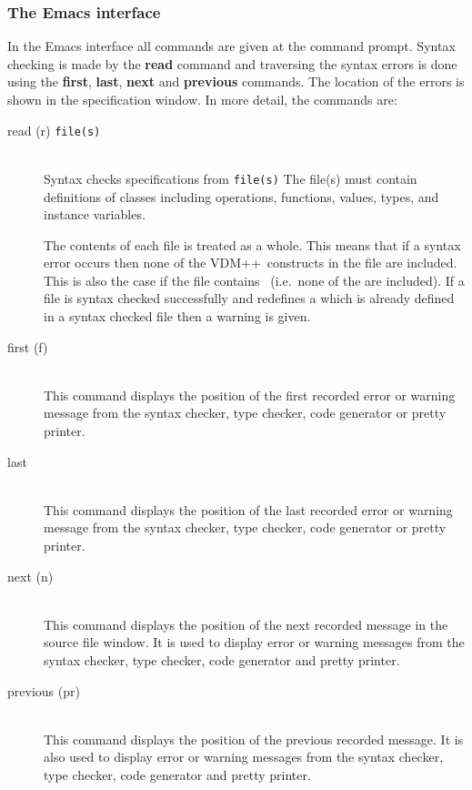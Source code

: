 \documentclass[\pformat,12pt]{article}
\newcommand{\vdmslpp}{VDM++}
\begin{document}
\subsubsection{The Emacs interface}

In the Emacs interface all commands are given at the command
prompt. Syntax checking is made by the \textbf{read} command and
traversing the syntax errors is done using the \textbf{first},
\textbf{last}, \textbf{next} and \textbf{previous} commands. The
location of the errors is shown in the specification
window. In more detail, the commands are:


\begin{description}
\item[read (r) {\tt file(s)}] \mbox{}\\
  Syntax checks specifications from {\tt file(s)}
    {The file(s) must contain definitions of classes
    including operations, functions, values, types, and instance
    variables.}

  The contents of each file is treated as a whole.  This means that
  if a syntax error occurs then none of the \vdmslpp\ constructs in
  the file are included.  This is also the case if the file contains
  ~(i.e.~none of the
   are included).  If a
  file is syntax checked successfully and redefines a 
   which
  is already defined in a syntax checked file then a warning is
  given.

\item[first (f)] \mbox{}\\
  This command displays the position of the first recorded error or
  warning message from the syntax checker, type checker, code
  generator or pretty printer.

\item[last] \mbox{}\\
  This command displays the position of the last recorded error or
  warning message from the syntax checker, type checker, code
  generator or pretty printer.

\item[next (n) ]\mbox{}\\
  This command displays the position of the next recorded message in
  the source file window.  It is used to display error or warning
  messages from the syntax checker, type checker, code generator and
  pretty printer.

\item[previous (pr)] \mbox{}\\
  This command displays the position of the previous recorded message.
  It is also used to display error or warning messages from the syntax
  checker, type checker, code generator and pretty printer.


\end{description}
\end{document}
